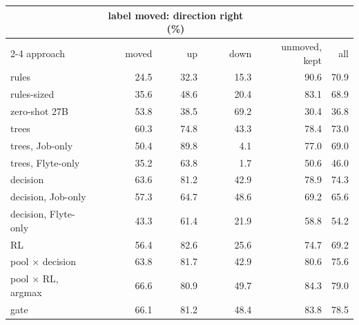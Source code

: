 \begin{tabular}{@{}lrrrrr@{}}
\toprule
& \multicolumn{3}{c}{label moved: direction right (\%)} && \\
\cmidrule(lr){2-4}
approach & moved & up & down & unmoved, kept & all \\
\midrule
rules & 24.5 & 32.3 & 15.3 & 90.6 & 70.9 \\
rules-sized & 35.6 & 48.6 & 20.4 & 83.1 & 68.9 \\
zero-shot 27B & 53.8 & 38.5 & 69.2 & 30.4 & 36.8 \\
trees & 60.3 & 74.8 & 43.3 & 78.4 & 73.0 \\
trees, Job-only & 50.4 & 89.8 & 4.1 & 77.0 & 69.0 \\
trees, Flyte-only & 35.2 & 63.8 & 1.7 & 50.6 & 46.0 \\
decision & 63.6 & 81.2 & 42.9 & 78.9 & 74.3 \\
decision, Job-only & 57.3 & 64.7 & 48.6 & 69.2 & 65.6 \\
decision, Flyte-only & 43.3 & 61.4 & 21.9 & 58.8 & 54.2 \\
RL & 56.4 & 82.6 & 25.6 & 74.7 & 69.2 \\
pool $\times$ decision & 63.8 & 81.7 & 42.9 & 80.6 & 75.6 \\
pool $\times$ RL, argmax & 66.6 & 80.9 & 49.7 & 84.3 & 79.0 \\
gate & 66.1 & 81.2 & 48.4 & 83.8 & 78.5 \\
\bottomrule
\end{tabular}
